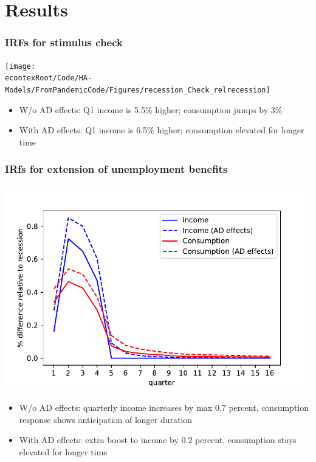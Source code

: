 \documentclass[pdflatex,aspectratio=169]{beamer}
\begin{document}
\section{Results}


\begin{frame}
\frametitle{IRFs for stimulus check}
\centering
\texttt{[image: \\econtexRoot/Code/HA-Models/FromPandemicCode/Figures/recession\_Check\_relrecession]}
\begin{itemize}
	\itemsep = .5\bigskipamount 
	\item W/o AD effects: Q1 income is 5.5\% higher; consumption jumps by 3\% 
	\item With AD effects: Q1 income is 6.5\% higher; consumption elevated for longer time
\end{itemize}
\end{frame}


\begin{frame}
\frametitle{IRfs for extension of unemployment benefits}
	\centering
	\includegraphics[width=0.6\linewidth]{Code/HA-Models/FromPandemicCode/Figures/recession_UI_relrecession}
\begin{itemize}
	\itemsep = .5\bigskipamount 
	\item W/o AD effects: quarterly income increases by max 0.7 percent, consumption response shows anticipation of longer duration
	\item With AD effects: extra boost to income by 0.2 percent, consumption stays elevated for longer time
\end{itemize}

\end{frame}
\end{document}
